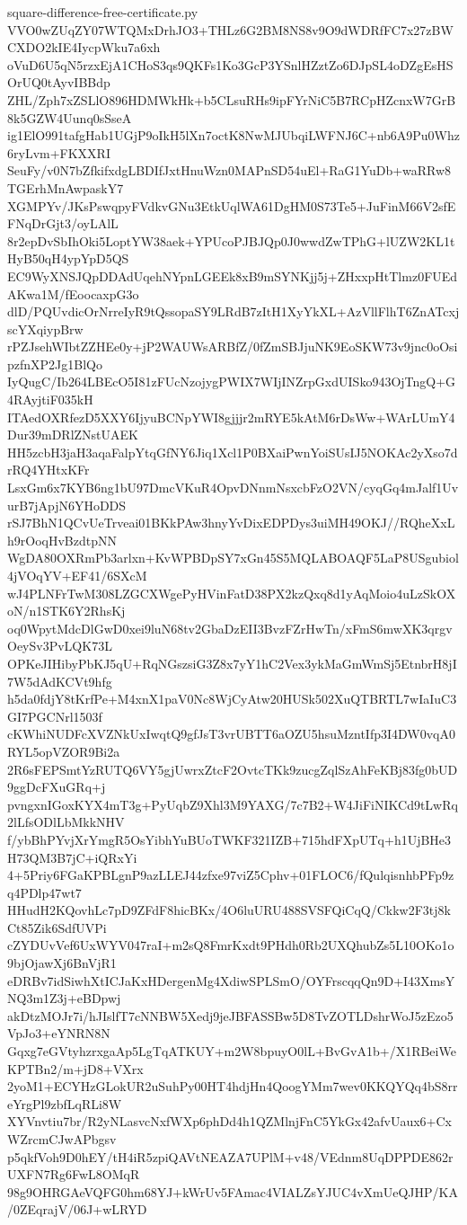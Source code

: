 \documentclass[11pt]{article}
\theoremstyle{definition}
\theoremstyle{remark}
\begin{document}
\begin{filecontents*}[overwrite]{square-difference-free-certificate.py}
VVO0wZUqZY07WTQMxDrhJO3+THLz6G2BM8NS8v9O9dWDRfFC7x27zBWCXDO2kIE4IycpWku7a6xh
oVuD6U5qN5rzxEjA1CHoS3qs9QKFs1Ko3GcP3YSnlHZztZo6DJpSL4oDZgEsHSOrUQ0tAyvIBBdp
ZHL/Zph7xZSLlO896HDMWkHk+b5CLsuRHs9ipFYrNiC5B7RCpHZcnxW7GrB8k5GZW4Uunq0sSseA
ig1ElO991tafgHab1UGjP9oIkH5lXn7octK8NwMJUbqiLWFNJ6C+nb6A9Pu0Whz6ryLvm+FKXXRI
SeuFy/v0N7bZfkifxdgLBDIfJxtHnuWzn0MAPnSD54uEl+RaG1YuDb+waRRw8TGErhMnAwpaskY7
XGMPYv/JKsPswqpyFVdkvGNu3EtkUqlWA61DgHM0S73Te5+JuFinM66V2sfEFNqDrGjt3/oyLAlL
8r2epDvSbIhOki5LoptYW38aek+YPUcoPJBJQp0J0wwdZwTPhG+lUZW2KL1tHyB50qH4ypYpD5QS
EC9WyXNSJQpDDAdUqehNYpnLGEEk8xB9mSYNKjj5j+ZHxxpHtTlmz0FUEdAKwa1M/fEoocaxpG3o
dlD/PQUvdicOrNrreIyR9tQssopaSY9LRdB7zItH1XyYkXL+AzVllFlhT6ZnATcxjscYXqiypBrw
rPZJsehWIbtZZHEe0y+jP2WAUWsARBfZ/0fZmSBJjuNK9EoSKW73v9jnc0oOsipzfnXP2Jg1BlQo
IyQugC/Ib264LBEcO5I81zFUcNzojygPWIX7WIjINZrpGxdUISko943OjTngQ+G4RAyjtiF035kH
ITAedOXRfezD5XXY6IjyuBCNpYWI8gjjjr2mRYE5kAtM6rDsWw+WArLUmY4Dur39mDRlZNstUAEK
HH5zcbH3jaH3aqaFalpYtqGfNY6Jiq1Xcl1P0BXaiPwnYoiSUsIJ5NOKAc2yXso7drRQ4YHtxKFr
LsxGm6x7KYB6ng1bU97DmcVKuR4OpvDNnmNsxcbFzO2VN/cyqGq4mJalf1UvurB7jApjN6YHoDDS
rSJ7BhN1QCvUeTrveai01BKkPAw3hnyYvDixEDPDys3uiMH49OKJ//RQheXxLh9rOoqHvBzdtpNN
WgDA80OXRmPb3arlxn+KvWPBDpSY7xGn45S5MQLABOAQF5LaP8USgubiol4jVOqYV+EF41/6SXcM
wJ4PLNFrTwM308LZGCXWgePyHVinFatD38PX2kzQxq8d1yAqMoio4uLzSkOXoN/n1STK6Y2RhsKj
oq0WpytMdcDlGwD0xei9luN68tv2GbaDzEII3BvzFZrHwTn/xFmS6mwXK3qrgvOeySv3PvLQK73L
OPKeJIHibyPbKJ5qU+RqNGszsiG3Z8x7yY1hC2Vex3ykMaGmWmSj5EtnbrH8jI7W5dAdKCVt9hfg
h5da0fdjY8tKrfPe+M4xnX1paV0Nc8WjCyAtw20HUSk502XuQTBRTL7wIaIuC3GI7PGCNrl1503f
cKWhiNUDFcXVZNkUxIwqtQ9gfJsT3vrUBTT6aOZU5hsuMzntIfp3I4DW0vqA0RYL5opVZOR9Bi2a
2R6sFEPSmtYzRUTQ6VY5gjUwrxZtcF2OvtcTKk9zucgZqlSzAhFeKBj83fg0bUD9ggDcFXuGRq+j
pvngxnIGoxKYX4mT3g+PyUqbZ9Xhl3M9YAXG/7c7B2+W4JiFiNIKCd9tLwRq2lLfsODlLbMkkNHV
f/ybBhPYvjXrYmgR5OsYibhYuBUoTWKF321IZB+715hdFXpUTq+h1UjBHe3H73QM3B7jC+iQRxYi
4+5Priy6FGaKPBLgnP9azLLEJ44zfxe97viZ5Cphv+01FLOC6/fQulqisnhbPFp9zq4PDlp47wt7
HHudH2KQovhLc7pD9ZFdF8hicBKx/4O6luURU488SVSFQiCqQ/Ckkw2F3tj8kCt85Zik6SdfUVPi
cZYDUvVef6UxWYV047raI+m2sQ8FmrKxdt9PHdh0Rb2UXQhubZs5L10OKo1o9bjOjawXj6BnVjR1
eDRBv7idSiwhXtICJaKxHDergenMg4XdiwSPLSmO/OYFrscqqQn9D+I43XmsYNQ3m1Z3j+eBDpwj
akDtzMOJr7i/hJIslfT7cNNBW5Xedj9jeJBFASSBw5D8TvZOTLDshrWoJ5zEzo5VpJo3+eYNRN8N
Gqxg7eGVtyhzrxgaAp5LgTqATKUY+m2W8bpuyO0lL+BvGvA1b+/X1RBeiWeKPTBn2/m+jD8+VXrx
2yoM1+ECYHzGLokUR2uSuhPy00HT4hdjHn4QoogYMm7wev0KKQYQq4bS8rreYrgPl9zbfLqRLi8W
XYVnvtiu7br/R2yNLasvcNxfWXp6phDd4h1QZMlnjFnC5YkGx42afvUaux6+CxWZrcmCJwAPbgsv
p5qkfVoh9D0hEY/tH4iR5zpiQAVtNEAZA7UPlM+v48/VEdnm8UqDPPDE862rUXFN7Rg6FwL8OMqR
98g9OHRGAeVQFG0hm68YJ+kWrUv5FAmac4VIALZsYJUC4vXmUeQJHP/KA/0ZEqrajV/06J+wLRYD

\end{filecontents*}
\end{document}
